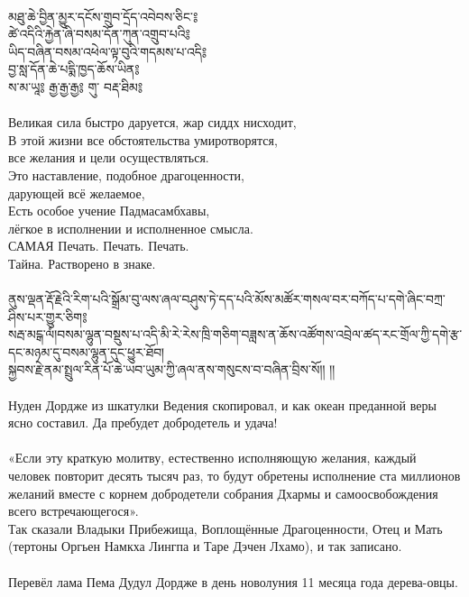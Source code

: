 \documentclass[4pt,oneside]{article}
\begin{document}
\\ \ti མཐུ་ཆེ་བྱིན་མྱུར་དངོས་གྲུབ་དྲོད་འབེབས་ཅིང་༔\\
    ཚེ་འདིའི་རྐྱེན་ཞི་བསམ་དོན་ཀུན་འགྲུབ་པའི༔\\
    ཡིད་བཞིན་བསམ་འཕེལ་ལྟ་བུའི་གདམས་པ་འདི༔ \\
    བྱ་སླ་དོན་ཆེ་པདྨི་ཁྱད་ཆོས་ཡིན༔ \\
    ས་མ་ཡཱ༔ རྒྱ་རྒྱ་རྒྱ༔ གུ་ བརྡ་ཐིམ༔\\
\\ \ru Великая сила быстро даруется, жар сиддх нисходит, \\
    В этой жизни все обстоятельства умиротворятся, \\
    \indent все желания и цели осуществляться.\\
    Это наставление, подобное драгоценности, \\
    \indent дарующей всё желаемое,\\
    Есть особое учение Падмасамбхавы, \\
    \indent лёгкое в исполнении и исполненное смысла.\\
    САМАЯ Печать. Печать. Печать. \\
    Тайна. Растворено в знаке.\\

\scriptsize
\\ \ti    ནུས་ལྡན་རྡོ་རྗེའི་རིག་པའི་སྒྲོམ་བུ་ལས་ཞལ་བཤུས་ཏེ་དད་པའི་མོས་མཚོར་གསལ་བར་བཀོད་པ་དགེ་ཞིང་བཀྲ་ཤིས་པར་གྱུར་ཅིག༔\\
    སརྦ་མངྒ་ལཾ།བསམ་ལྷུན་བསྡུས་པ་འདི་མི་རེ་རེས་ཁྲི་གཅིག་བཟླས་ན་ཆོས་འཚོགས་འབྲེལ་ཚད་རང་གྲོལ་ཀྱི་དགེ་རྩ་དང་མཉམ་དུ་བསམ་ལྷུན་དུང་ཕྱུར་ཐོབ།\\
    སྐྱབས་རྗེ་ནམ་སྤྲུལ་རིན་པོ་ཆེ་ཡབ་ཡུམ་ཀྱི་ཞལ་ནས་གསུངས་བ་བཞིན་བྲིས་སོ།། །།\\
\\ \ru
Нуден Дордже из шкатулки Ведения скопировал, и как океан преданной веры ясно составил. Да пребудет добродетель и удача!\\
\\
«Если эту краткую молитву, естественно исполняющую желания,  каждый человек повторит десять тысяч раз, то будут обретены исполнение ста миллионов желаний вместе с корнем добродетели собрания Дхармы и самоосвобождения всего встречающегося».\\
Так сказали Владыки Прибежища, Воплощённые Драгоценности, Отец и Мать (тертоны Оргьен Намкха Лингпа и Таре Дэчен Лхамо), и так записано.\\
\\
Перевёл лама Пема Дудул Дордже в день новолуния 11 месяца года дерева-овцы.\\
\end{document}
